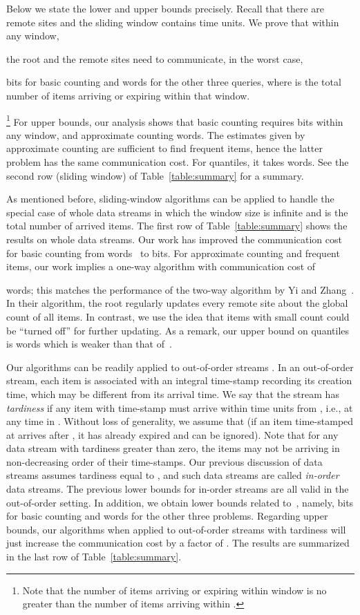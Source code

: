 \documentclass[proceedings]{stacs}
\theoremstyle{definition}\newtheorem{fact}{Fact}
\begin{document}
Below we state the lower and upper bounds precisely.
  {Recall that there are  remote sites and
the sliding window contains  time units.
We prove that}
 {within any window,}
  {the root and the remote sites need to communicate,
in the worst case,

bits  for basic counting
and 
words for the other three queries, where  is the total number of items
arriving or expiring within that
window.}\footnote{  {Note
that the number of items arriving or expiring within window
 is no greater than the number of items arriving within
.}}
For upper bounds, our analysis shows that
basic counting requires  bits within any window,
and approximate counting  words.
The estimates given by approximate counting are
sufficient to find frequent items, hence the latter problem
has the same communication cost.
For quantiles, it takes  words.
See the second row (sliding window)
of Table~\ref{table:summary} for a summary.


As mentioned before, sliding-window algorithms can be
applied to handle the special case of whole data streams
  {in which the window size  is infinite and 
  is the total number of arrived items.}
The first row of Table~\ref{table:summary} shows
the results on whole data streams.
Our work has improved the communication cost for
basic counting from 
words~\cite{KeralapuraCR06}
to  bits.
For approximate counting and frequent items, our work implies
a one-way algorithm with communication cost of

words; this matches the performance of
the two-way algorithm by Yi and Zhang~\cite{YiZ08}.
In their algorithm, the root
regularly updates every remote site about the global count of all items.
In contrast,
we use the idea that items with small count could
be ``turned off'' for further updating.
As a remark, our upper bound on quantiles is
 words
which is weaker than that of~\cite{YiZ08}.



Our algorithms can be readily applied
to out-of-order streams \cite{BuschT07,CormodeKT08}.
 {In an out-of-order stream, each item is associated
  with an integral time-stamp recording its creation time, which may
  be different from its arrival time.
We say that the stream has \emph{tardiness}  if
any item with time-stamp  must arrive within  time
units from , i.e., at any time in .
Without loss of generality, we assume that  (if an item time-stamped at  arrives after ,
it has already expired and can be ignored).
Note that for any data stream with tardiness greater than zero, the
items may not be arriving in non-decreasing order of their time-stamps.
Our previous discussion of
data streams assumes tardiness equal to , and
such data streams are called \emph{in-order} data streams.}
The previous lower bounds for in-order streams are all valid
in the out-of-order setting. In addition,
we obtain lower bounds related to~,
namely,  bits for basic counting and
 words for the other three problems.
Regarding upper bounds,
our algorithms when applied to
out-of-order streams with tardiness  will just
increase the communication
cost by a factor of .
The results are summarized in the last row of Table~\ref{table:summary}.
\end{document}
